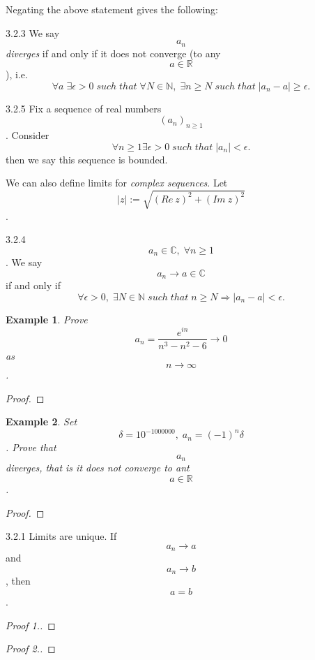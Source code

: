 \documentclass[a4paper]{article}
\def\rr{{\mathbb R}}
\def\cc{{\mathbb C}}
\def\nn{{\mathbb N}}
\newtheorem{example}{Example}[subsection]
\begin{document}
  Negating the above statement gives the following:
\begin{definition}{3.2.3}{}
    We say  $$a_n$$ \textit{diverges} if and only if it does not converge (to any $$a\in \rr$$), i.e.
    \begin{equation*}
        \forall a \; \exists \epsilon >0 \; such \; that\; \forall N \in \nn ,\; \exists n \geq N \; such \;that \; |a_n-a|\geq \epsilon.
    \end{equation*}
\end{definition}
\begin{definition}{3.2.5}{}
    Fix a sequence of real numbers $$(a_n)_{n\geq 1}$$. Consider 
    \begin{equation*}
        \forall n\geq 1 \exists \epsilon >0 \; such \; that \; |a_n|<\epsilon.
    \end{equation*}
    then we say this sequence is bounded.
\end{definition}
We can also define limits for \textit{complex sequences}. Let $$|z|:= \sqrt{(Re\:z)^2+(Im\:z)^2}$$.
\begin{definition}{3.2.4}{}
        $$a_n\in \cc ,\; \forall n\geq 1$$. We say $$a_n\rightarrow a\in \cc$$ if and only if
        \begin{equation*}
            \forall \epsilon >0,\; \exists N \in \nn \; such \; that\; n\geq N \Longrightarrow |a_n-a|<\epsilon. 
        \end{equation*}
\end{definition}
\begin{example}
    Prove $$a_n=\frac{e^{in}}{n^3-n^2-6}\rightarrow 0$$ as $$n\rightarrow \infty$$.
\end{example}
\begin{proof}

\end{proof}
\begin{example}
    Set $$\delta = 10^{-1000000},\; a_n=(-1)^n\delta$$. Prove that $$a_n$$ diverges, that is it does not converge to ant $$a\in \rr$$.
\end{example}
\begin{proof}
\end{proof}
\begin{theorem}{3.2.1}{}
    Limits are unique. If $$a_n\rightarrow a$$ and $$a_n\rightarrow b$$, then $$a=b$$.
\end{theorem}
\begin{proof}[Proof 1.]
\end{proof}
\begin{proof}[Proof 2.]
\end{proof}
\end{document}
